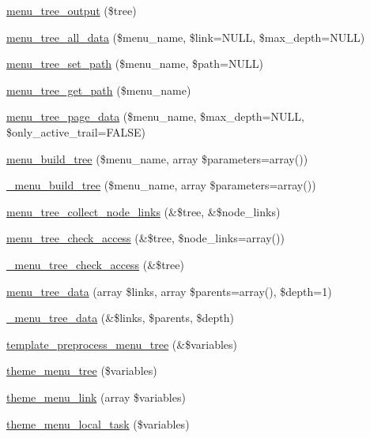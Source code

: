 \begin{DoxyCompactItemize}
\item 
\hyperlink{group__menu_ga2ef0691992a9df71eb3455ba774053e7}{menu\_\-tree\_\-output} (\$tree)
\item 
\hyperlink{group__menu_ga4f06528e6ed613b6a885e051035b322a}{menu\_\-tree\_\-all\_\-data} (\$menu\_\-name, \$link=NULL, \$max\_\-depth=NULL)
\item 
\hyperlink{group__menu_gacbb655f92275e3c823637edbd9441cdd}{menu\_\-tree\_\-set\_\-path} (\$menu\_\-name, \$path=NULL)
\item 
\hyperlink{group__menu_ga719b18e6d93314528b8726b333f300c0}{menu\_\-tree\_\-get\_\-path} (\$menu\_\-name)
\item 
\hyperlink{group__menu_ga58b0372b3340be5d070d4ca8bf5a7af8}{menu\_\-tree\_\-page\_\-data} (\$menu\_\-name, \$max\_\-depth=NULL, \$only\_\-active\_\-trail=FALSE)
\item 
\hyperlink{group__menu_gabd17638ed8a36d5412244fd7c2456eb7}{menu\_\-build\_\-tree} (\$menu\_\-name, array \$parameters=array())
\item 
\hyperlink{group__menu_ga036009a003a68a01a420737d9c1b30c0}{\_\-menu\_\-build\_\-tree} (\$menu\_\-name, array \$parameters=array())
\item 
\hyperlink{group__menu_ga0c9a63fbbdf8496828f1f80d37459475}{menu\_\-tree\_\-collect\_\-node\_\-links} (\&\$tree, \&\$node\_\-links)
\item 
\hyperlink{group__menu_ga6374db210d96026fb70431def083a7a5}{menu\_\-tree\_\-check\_\-access} (\&\$tree, \$node\_\-links=array())
\item 
\hyperlink{group__menu_gad59ba7ae64f452408201f82f8cb7dc25}{\_\-menu\_\-tree\_\-check\_\-access} (\&\$tree)
\item 
\hyperlink{group__menu_ga80a5defa3498d4e60321af746c1104c3}{menu\_\-tree\_\-data} (array \$links, array \$parents=array(), \$depth=1)
\item 
\hyperlink{group__menu_gaf179327ae18d3a8ace0453b528707e3e}{\_\-menu\_\-tree\_\-data} (\&\$links, \$parents, \$depth)
\item 
\hyperlink{group__menu_ga3b3b2907371200b81f18bfaed7538855}{template\_\-preprocess\_\-menu\_\-tree} (\&\$variables)
\item 
\hyperlink{group__themeable_ga33100f9d25d899b017bda922086f7358}{theme\_\-menu\_\-tree} (\$variables)
\item 
\hyperlink{group__themeable_ga60ee17f550a787c90d1452f6bbe98a56}{theme\_\-menu\_\-link} (array \$variables)
\item 
\hyperlink{group__themeable_gacf0d36288bfdf480eb55328d74f65b9c}{theme\_\-menu\_\-local\_\-task} (\$variables)

\end{DoxyCompactItemize}
